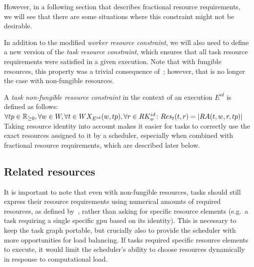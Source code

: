 However, in a following section that describes fractional resource requirements, we will see that
there are some situations where this constraint might not be desirable.

In addition to the modified \emph{worker resource constraint}, we will also need to define a new version of
the \emph{task resource constraint}, which ensures that all task resource requirements were satisfied in a
given execution. Note that with fungible resources, this property was a trivial consequence
of~; however, that is no longer the case with non-fungible resources.

\vspace{2mm} A
\emph{task non-fungible resource constraint} in the context of an execution $E^{id}$ is defined as
follows: \\
$\forall tp\in\mathbb{R}_{\geq{}0}, \forall w\in{}W, \forall
	t\in{}WX_{E^{id}}(w, tp), \forall
	r\in{}RK_w^{id}\colon Res_t(t, r) =
	|RA(t, w, r, tp)|$ \\

Taking resource identity into account makes it easier for tasks to correctly use the exact
resources assigned to it by a scheduler, especially when combined with fractional resource
requirements, which are described later below.

\subsection{Related resources}
It is important to note that even with non-fungible resources, tasks should still express their
resource requirements using numerical amounts of required resources, as defined
by~, rather than asking for specific resource elements (e.g.\ a task
requiring a single specific \gls{gpu} based on its identity). This is necessary to
keep the task graph portable, but crucially also to provide the scheduler with more opportunities
for load balancing. If tasks required specific resource elements to execute, it would limit the
scheduler's ability to choose resources dynamically in response to computational load.

